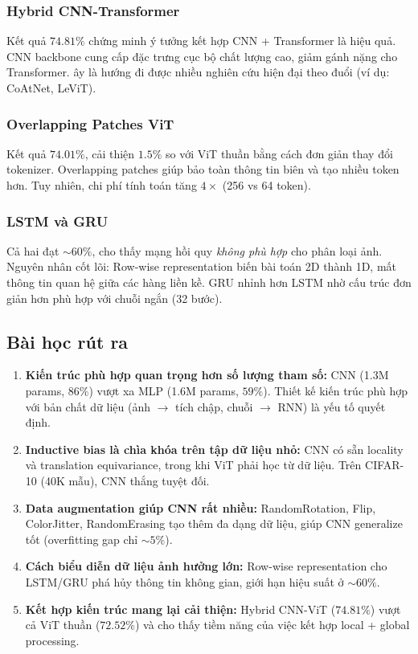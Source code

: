 \documentclass[a4paper]{article}
\theoremstyle{definition}
\begin{document}
\subsubsection{Hybrid CNN-Transformer}
Kết quả $74.81\%$ chứng minh ý tưởng kết hợp CNN + Transformer là hiệu quả. CNN backbone cung cấp đặc trưng cục bộ chất lượng cao, giảm gánh nặng cho Transformer. \DJ ây là hướng đi được nhiều nghiên cứu hiện đại theo đuổi (ví dụ: CoAtNet, LeViT).

\subsubsection{Overlapping Patches ViT}
Kết quả $74.01\%$, cải thiện $1.5\%$ so với ViT thuần bằng cách đơn giản thay đổi tokenizer. Overlapping patches giúp bảo toàn thông tin biên và tạo nhiều token hơn. Tuy nhiên, chi phí tính toán tăng $4\times$ (256 vs 64 token).

\subsubsection{LSTM và GRU}
Cả hai đạt $\sim 60\%$, cho thấy mạng hồi quy \textit{không phù hợp} cho phân loại ảnh. Nguyên nhân cốt lõi: Row-wise representation biến bài toán 2D thành 1D, mất thông tin quan hệ giữa các hàng liền kề. GRU nhỉnh hơn LSTM nhờ cấu trúc đơn giản hơn phù hợp với chuỗi ngắn (32 bước).

\subsection{Bài học rút ra}

\begin{enumerate}
	\item \textbf{Kiến trúc phù hợp quan trọng hơn số lượng tham số:} CNN (1.3M params, $86\%$) vượt xa MLP (1.6M params, $59\%$). Thiết kế kiến trúc phù hợp với bản chất dữ liệu (ảnh $\to$ tích chập, chuỗi $\to$ RNN) là yếu tố quyết định.

	\item \textbf{Inductive bias là chìa khóa trên tập dữ liệu nhỏ:} CNN có sẵn locality và translation equivariance, trong khi ViT phải học từ dữ liệu. Trên CIFAR-10 (40K mẫu), CNN thắng tuyệt đối.

	\item \textbf{Data augmentation giúp CNN rất nhiều:} RandomRotation, Flip, ColorJitter, RandomErasing tạo thêm đa dạng dữ liệu, giúp CNN generalize tốt (overfitting gap chỉ $\sim 5\%$).

	\item \textbf{Cách biểu diễn dữ liệu ảnh hưởng lớn:} Row-wise representation cho LSTM/GRU phá hủy thông tin không gian, giới hạn hiệu suất ở $\sim 60\%$.

	\item \textbf{Kết hợp kiến trúc mang lại cải thiện:} Hybrid CNN-ViT ($74.81\%$) vượt cả ViT thuần ($72.52\%$) và cho thấy tiềm năng của việc kết hợp local + global processing.
\end{enumerate}
\end{document}
